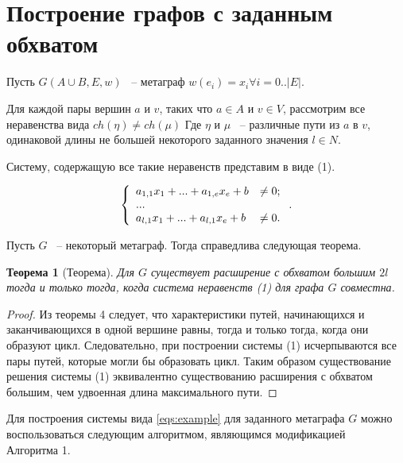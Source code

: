 \documentclass[14pt]{mmcs-article}
\newtheorem{theorem}{Теорема}
\begin{document}
\section{Построение графов с заданным обхватом}

Пусть $G(A \cup B, E, w)$ ~-- метаграф $w(e_i) = x_i \forall i = 0..|E|$.

Для каждой пары вершин $a$ и $v$, таких что $a \in A$ и $v \in V$, рассмотрим все неравенства вида $ch(\eta) \neq ch(\mu)$ Где $\eta$ и $\mu$ ~-- различные пути из $a$ в $v$, одинаковой длины не большей некоторого заданного значения $l \in N$.

Систему, содержащую все такие неравенств представим в виде (1).

\begin{equation}
    \centering
    \left\{
        \begin{array}{ll}
            a_{1,1} x_1 + ... + a_{1,e} x_e + b &\neq 0 ; \\
            ...\\
            a_{l,1} x_1 + ... + a_{l,1} x_e + b &\neq 0 .\\
        \end{array}
    \right..
    \label{eqs:example}
\end{equation}

Пусть $G$ ~-- некоторый метаграф. Тогда справедлива следующая теорема.

\begin{theorem}[Теорема]

Для $G$ существует расширение с обхватом большим $2l$  тогда и только тогда, когда система неравенств (1) для графа $G$ совместна.

\end{theorem}

\begin{proof}

Из теоремы 4 следует, что характеристики путей, начинающихся и заканчивающихся в одной вершине равны, тогда и только тогда, когда они образуют цикл. Следовательно, при построении системы (1) исчерпываются все пары путей, которые могли бы образовать цикл. Таким образом существование решения системы (1) эквивалентно существованию расширения с обхватом большим, чем удвоенная длина максимального пути.

\end{proof}

Для построения системы вида \ref{eqs:example} для заданного метаграфа $G$ можно воспользоваться следующим алгоритмом, являющимся модификацией\\ Алгоритма 1.
\end{document}
